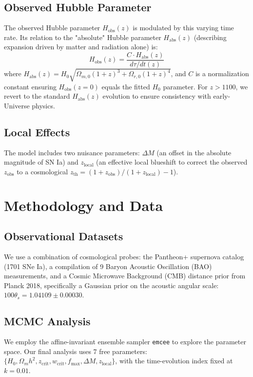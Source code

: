 \documentclass[12pt, a4paper]{article}
\begin{document}
\subsection{Observed Hubble Parameter}
The observed Hubble parameter $H_{\text{obs}}(z)$ is modulated by this varying time rate. Its relation to the "absolute" Hubble parameter $H_{\text{abs}}(z)$ (describing expansion driven by matter and radiation alone) is:
\begin{equation}
H_{\text{obs}}(z) = \frac{C \cdot H_{\text{abs}}(z)}{d\tau/dt(z)}
\label{eq:hobs}
\end{equation}
where $H_{\text{abs}}(z) = H_0 \sqrt{\Omega_{m,0}(1+z)^3 + \Omega_{r,0}(1+z)^4}$, and $C$ is a normalization constant ensuring $H_{\text{obs}}(z=0)$ equals the fitted $H_0$ parameter. For $z > 1100$, we revert to the standard $H_{\text{abs}}(z)$ evolution to ensure consistency with early-Universe physics.

\subsection{Local Effects}
The model includes two nuisance parameters: $\Delta M$ (an offset in the absolute magnitude of SN Ia) and $z_{\text{local}}$ (an effective local blueshift to correct the observed $z_{\text{obs}}$ to a cosmological $z_{\text{th}} = (1 + z_{\text{obs}}) / (1 + z_{\text{local}}) - 1$).

\section{Methodology and Data}
\subsection{Observational Datasets}
We use a combination of cosmological probes: the Pantheon+ supernova catalog (1701 SNe Ia), a compilation of 9 Baryon Acoustic Oscillation (BAO) measurements, and a Cosmic Microwave Background (CMB) distance prior from Planck 2018, specifically a Gaussian prior on the acoustic angular scale: $100 \theta_s = 1.04109 \pm 0.00030$.

\subsection{MCMC Analysis}
We employ the affine-invariant ensemble sampler \texttt{emcee} to explore the parameter space. Our final analysis uses 7 free parameters: $\{H_0, \Omega_m h^2, z_{\text{crit}}, w_{\text{crit}}, f_{\max}, \Delta M, z_{\text{local}}\}$, with the time-evolution index fixed at $k=0.01$.
\end{document}
